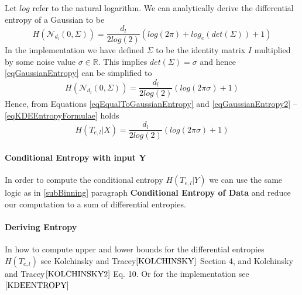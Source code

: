 \documentclass[dissertation.tex]{subfiles}
\begin{document}
Let $log$ refer to the natural logarithm. We can analytically derive the
differential entropy of a Gaussian to be
\begin{equation}
  H(\mathcal{N}_{d_l}(0, \Sigma))
  =
  \frac{d_l}{2log(2)}(log(2\pi) + log_e({det(\Sigma)})+1)
  \label{eqGaussianEntropy}
\end{equation}
In the implementation we have defined $\Sigma$ to be the identity matrix $I$
multiplied by some noise value $\sigma\in\mathbb{R}$. This implies
$det(\Sigma)=\sigma$ and hence \autoref{eqGaussianEntropy} can be simplified to
\begin{equation}
  H(\mathcal{N}_{d_l}(0, \Sigma))
  =
  \frac{d_l}{2log(2)}(log(2\pi\sigma)+1)
  \label{eqGaussianEntropy2}
\end{equation}
Hence, from Equations \ref{eqEqualToGaussianEntropy} and
\ref{eqGaussianEntropy2} -- \autoref{eqKDEEntropyFormulae} holds
\begin{equation}
  H(T_{e,l}|X)
  =
  \frac{d_l}{2log(2)}(log(2\pi\sigma)+1)
  \label{eqKDEEntropyFormulae}
\end{equation}

\paragraph{Conditional Entropy with input Y}
In order to compute the conditional entropy $H(T_{e,l}|Y)$ we can use the same
logic as in \autoref{subBinning} paragraph \textbf{Conditional Entropy of Data}
and reduce our computation to a sum of differential entropies.

\paragraph{Deriving Entropy}
In how to compute upper and lower bounds for the differential entropies
$H(T_{e,l})$ see Kolchinsky and Tracey$\cite{KOLCHINSKY}$ Section 4, and
Kolchinsky and Tracey$\cite{KOLCHINSKY2}$ Eq. 10. Or for the implementation
see$\cite{KDEENTROPY}$

\newpage
\end{document}
